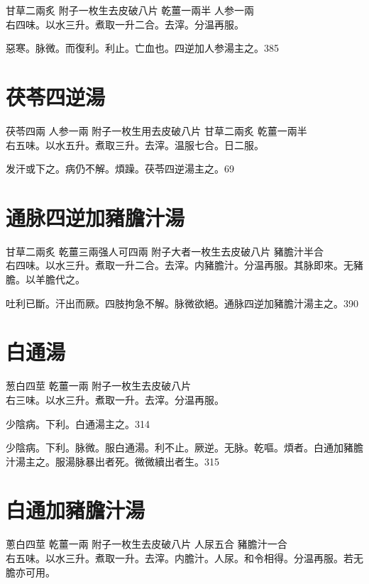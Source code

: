 甘草{\scriptsize 二兩炙} 附子{\scriptsize 一枚生去皮破八片} 乾薑{\scriptsize 一兩半} 人参{\scriptsize 一兩}\\
右四味。以水三升。煮取一升二合。去滓。分温再服。

惡寒。脉微。而復利。利止。亡血也。四逆加人参湯主之。385

\section{茯苓四逆湯}

茯苓{\scriptsize 四兩} 人参{\scriptsize 一兩} 附子{\scriptsize 一枚生用去皮破八片} 甘草{\scriptsize 二兩炙} 乾薑{\scriptsize 一兩半}\\
右五味。以水五升。煮取三升。去滓。温服七合。日二服。

发汗或下之。{\khaaitp 病仍}不解。煩躁。茯苓四逆湯主之。69

\section{通脉四逆加豬膽汁湯}

甘草{\scriptsize 二兩炙} 乾薑{\scriptsize 三兩强人可四兩} 附子{\scriptsize 大者一枚生去皮破八片} 豬膽汁{\scriptsize 半合}\\
右四味。以水三升。煮取一升二合。去滓。内豬膽汁。分温再服。其脉即來。无豬膽。以羊膽代之。

吐利已斷。汗出而厥。四肢拘急不解。脉微欲絕。通脉四逆加豬膽汁湯主之。390

\section{白通湯}

葱白{\scriptsize 四莖} 乾薑{\scriptsize 一兩} 附子{\scriptsize 一枚生去皮破八片}\\
右三味。以水三升。煮取一升。去滓。分温再服。

少陰病。下利。白通湯主之。314

少陰病。下利。脉微。服白通湯。利不止。厥逆。无脉。乾嘔。煩者。白通加豬膽汁湯主之。服湯脉暴出者死。微{\khaaitp 微}續{\khaaitp 出}者生。315

\section{白通加豬膽汁湯}

蔥白{\scriptsize 四莖} 乾薑{\scriptsize 一兩} 附子{\scriptsize 一枚生去皮破八片} 人尿{\scriptsize 五合} 豬膽汁{\scriptsize 一合}\\
右五味。以水三升。煮取一升。去滓。内膽汁。人尿。和令相得。分温再服。若无膽亦可用。

